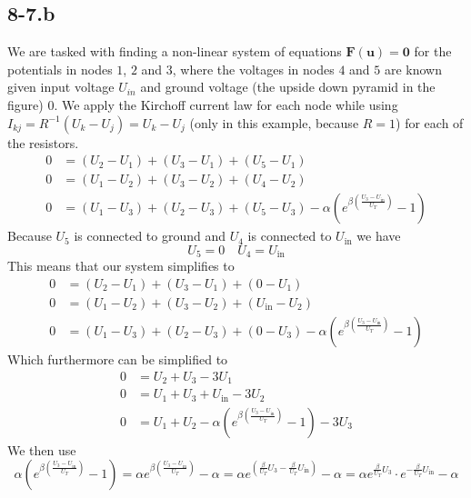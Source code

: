 \documentclass{article}
\begin{document}
\subsection*{8-7.b}
We are tasked with finding a non-linear system of equations $\mathbf{F}\left(\mathbf{u}\right) = \mathbf{0}$ for the potentials in nodes $1$, $2$ and $3$, where the voltages in nodes $4$ and $5$ are known given input voltage $U_{in}$ and ground voltage (the upside down pyramid in the figure) $0$. We apply the Kirchoff current law for each node while using $I_{kj} = R^{-1}\left(U_{k} - U_{j}\right) = U_{k} - U_{j}$ (only in this example, because $R=1$) for each of the resistors.
\begin{align*}
    0&=\left(U_{2} - U_{1}\right) + \left(U_{3} - U_{1}\right) + \left(U_{5} - U_{1}\right) \\
    0&=\left(U_{1} - U_{2}\right) + \left(U_{3} - U_{2}\right) + \left(U_{4} - U_{2}\right)  \\ 0&=
    \left(U_{1} - U_{3}\right) + \left(U_{2} - U_{3}\right) + \left(U_{5} - U_{3}\right) - \alpha\left(e^{\beta\left(\frac{U_{3}-U_{\text{in}}}{U_{T}}\right)}-1\right)
\end{align*}
Because $U_{5}$ is connected to ground and $U_{4}$ is connected to $U_{\text{in}}$ we have
\begin{equation*}
    U_{5} = 0 \quad U_{4} = U_{\text{in}}
\end{equation*}
This means that our system simplifies to 
\begin{align*}
    0&=\left(U_{2} - U_{1}\right) + \left(U_{3} - U_{1}\right) + \left(0 - U_{1}\right) \\
    0&=\left(U_{1} - U_{2}\right) + \left(U_{3} - U_{2}\right) + \left(U_{\text{in}} - U_{2}\right) \\
   0&= \left(U_{1} - U_{3}\right) + \left(U_{2} - U_{3}\right) + \left(0- U_{3}\right) - \alpha\left(e^{\beta\left(\frac{U_{3}-U_{\text{in}}}{U_{T}}\right)}-1\right)
\end{align*}
Which furthermore can be simplified to 
\begin{align*}
    0 &= U_{2} + U_{3} - 3U_{1}\\
    0&= U_{1} + U_{3} + U_{\text{in}} -3U_{2} \\
    0 &= U_{1} + U_{2} - \alpha\left(e^{\beta\left(\frac{U_{3}-U_{\text{in}}}{U_{T}}\right)}-1\right) -3U_{3}
\end{align*}
We then use
\begin{equation*}
 \alpha\left(e^{\beta\left(\frac{U_{3}-U_{\text{in}}}{U_{T}}\right)}-1\right) =  \alpha e^{\beta\left(\frac{U_{3}-U_{\text{in}}}{U_{T}}\right)} - \alpha =   \alpha e^{\left(\frac{\beta}{U_{T}}U_{3} - \frac{\beta}{U_{T}}U_{\text{in}}\right)} - \alpha = \alpha e^{\frac{\beta}{U_{T}}U_{3}} \cdot e^{-\frac{\beta}{U_{T}}U_{\text{in}}} - \alpha
\end{equation*}
\end{document}
